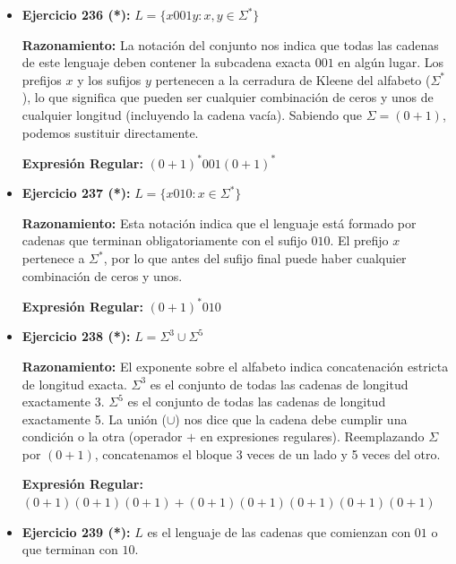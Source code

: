 \documentclass[12pt]{article}
\begin{document}
\vspace{0.5cm}

\begin{itemize}
    \item \textbf{Ejercicio 236 (*):} $L = \{x001y : x,y \in \Sigma^*\}$
    
    \textbf{Razonamiento:} La notación del conjunto nos indica que todas las cadenas de este lenguaje deben contener la subcadena exacta $001$ en algún lugar. Los prefijos $x$ y los sufijos $y$ pertenecen a la cerradura de Kleene del alfabeto ($\Sigma^*$), lo que significa que pueden ser cualquier combinación de ceros y unos de cualquier longitud (incluyendo la cadena vacía). Sabiendo que $\Sigma = (0+1)$, podemos sustituir directamente.
    
    \textbf{Expresión Regular:} $(0+1)^*001(0+1)^*$

    \vspace{0.4cm}
    
    \item \textbf{Ejercicio 237 (*):} $L = \{x010 : x \in \Sigma^*\}$
    
    \textbf{Razonamiento:} Esta notación indica que el lenguaje está formado por cadenas que terminan obligatoriamente con el sufijo $010$. El prefijo $x$ pertenece a $\Sigma^*$, por lo que antes del sufijo final puede haber cualquier combinación de ceros y unos.
    
    \textbf{Expresión Regular:} $(0+1)^*010$

    \vspace{0.4cm}
    
    \item \textbf{Ejercicio 238 (*):} $L = \Sigma^3 \cup \Sigma^5$
    
    \textbf{Razonamiento:} El exponente sobre el alfabeto indica concatenación estricta de longitud exacta. $\Sigma^3$ es el conjunto de todas las cadenas de longitud exactamente 3. $\Sigma^5$ es el conjunto de todas las cadenas de longitud exactamente 5. La unión ($\cup$) nos dice que la cadena debe cumplir una condición o la otra (operador $+$ en expresiones regulares). Reemplazando $\Sigma$ por $(0+1)$, concatenamos el bloque 3 veces de un lado y 5 veces del otro.
    
    \textbf{Expresión Regular:} $(0+1)(0+1)(0+1) + (0+1)(0+1)(0+1)(0+1)(0+1)$

    \vspace{0.4cm}
    
    \item \textbf{Ejercicio 239 (*):} $L$ es el lenguaje de las cadenas que comienzan con $01$ o que terminan con $10$.
    

\end{itemize}
\end{document}
